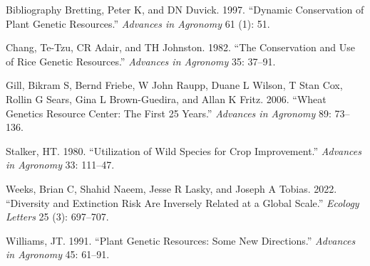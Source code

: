 \documentclass[
  ignorenonframetext,
  aspectratio=169]{beamer}
\newlength{\cslhangindent}
\newenvironment{cslreferences}%
  {\setlength{\parindent}{0pt}%
  \everypar{\setlength{\hangindent}{\cslhangindent}}\ignorespaces}%
  {\par}
\begin{document}
\begin{frame}{Bibliography}
\hypertarget{refs}{}
\begin{cslreferences}
\leavevmode\hypertarget{ref-bretting1997dynamic}{}%
Bretting, Peter K, and DN Duvick. 1997. ``Dynamic Conservation of Plant
Genetic Resources.'' \emph{Advances in Agronomy} 61 (1): 51.

\leavevmode\hypertarget{ref-chang1982conservation}{}%
Chang, Te-Tzu, CR Adair, and TH Johnston. 1982. ``The Conservation and
Use of Rice Genetic Resources.'' \emph{Advances in Agronomy} 35: 37--91.

\leavevmode\hypertarget{ref-gill2006wheat}{}%
Gill, Bikram S, Bernd Friebe, W John Raupp, Duane L Wilson, T Stan Cox,
Rollin G Sears, Gina L Brown-Guedira, and Allan K Fritz. 2006. ``Wheat
Genetics Resource Center: The First 25 Years.'' \emph{Advances in
Agronomy} 89: 73--136.

\leavevmode\hypertarget{ref-stalker1980utilization}{}%
Stalker, HT. 1980. ``Utilization of Wild Species for Crop Improvement.''
\emph{Advances in Agronomy} 33: 111--47.

\leavevmode\hypertarget{ref-weeks2022diversity}{}%
Weeks, Brian C, Shahid Naeem, Jesse R Lasky, and Joseph A Tobias. 2022.
``Diversity and Extinction Risk Are Inversely Related at a Global
Scale.'' \emph{Ecology Letters} 25 (3): 697--707.

\leavevmode\hypertarget{ref-williams1991plant}{}%
Williams, JT. 1991. ``Plant Genetic Resources: Some New Directions.''
\emph{Advances in Agronomy} 45: 61--91.
\end{cslreferences}
\end{frame}
\end{document}
